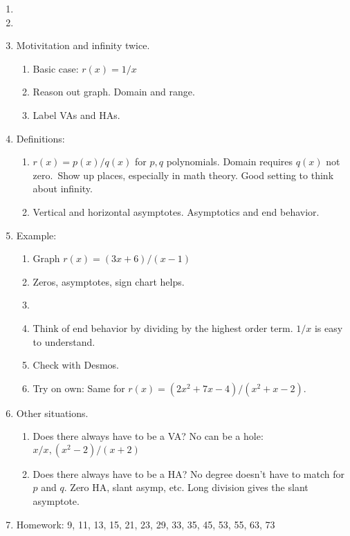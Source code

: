 \documentclass{article}
\begin{document}
\begin{enumerate}

\item 

\item 

\item Motivitation and infinity twice.
\begin{enumerate}
\item Basic case: $r(x) = 1/x$
\item Reason out graph. Domain and range.
\item Label VAs and HAs. 
\end{enumerate}

\item Definitions:
\begin{enumerate}
\item $r(x) = p(x)/q(x)$ for $p,q$ polynomials. Domain requires $q(x)$ not zero. Show up places, especially in math theory. Good setting to think about infinity.
\item Vertical and horizontal asymptotes. Asymptotics and end behavior.
\end{enumerate}

\item Example:
\begin{enumerate}
\item Graph $r(x)=(3x+6)/(x-1)$
\item Zeros, asymptotes, sign chart helps.
\item \item Think of end behavior by dividing by the highest order term. $1/x$ is easy to understand.
\item Check with Desmos.
\item Try on own: Same for $r(x)=(2x^2+7x-4)/(x^2+x-2)$.
\end{enumerate}

\item Other situations.
\begin{enumerate}
\item Does there always have to be a VA? No can be a hole: $x/x, (x^2-2)/(x+2)$
\item Does there always have to be a HA? No degree doesn't have to match for $p$ and $q$. Zero HA, slant asymp, etc. Long division gives the slant asymptote.
\end{enumerate}

\item Homework: 9, 11, 13, 15, 21, 23, 29, 33, 35, 45, 53, 55, 63, 73

\end{enumerate}
\end{document}
